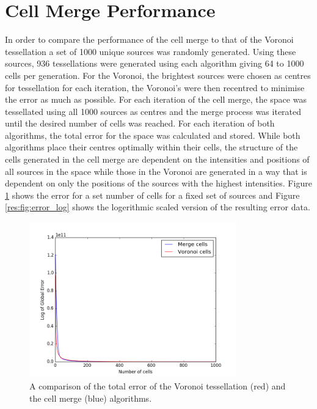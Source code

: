 \section{Cell Merge Performance}
In order to compare the performance of the cell merge to that of the Voronoi tessellation a set of 1000 unique sources was randomly generated. Using these sources, 936 tessellations were generated using each algorithm giving 64 to 1000 cells per generation. For the Voronoi, the brightest sources were chosen as centres for tessellation for each iteration, the Voronoi's were then recentred to minimise the error as much as possible. For each iteration of the cell merge, the space was tessellated using all 1000 sources as centres and the merge process was iterated until the desired number of cells was reached. For each iteration of both algorithms, the total error for the space was calculated and stored. While both algorithms place their centres optimally within their cells, the structure of the cells generated in the cell merge are dependent on the intensities and positions of all sources in the space while those in the Voronoi are generated in a way that is dependent on only the positions of the sources with the highest intensities. Figure \ref{res:fig:error} shows the error for a set number of cells for a fixed set of sources and Figure \ref{res:fig:error_log} shows the logerithmic scaled version of the resulting error data.
\begin{figure}[H]
\centering
\includegraphics[width=0.8\textwidth]{Images/result_error.png}
\caption{A comparison of the total error of the Voronoi tessellation (red) and the cell merge (blue) algorithms.}
\label{res:fig:error}
\end{figure}
